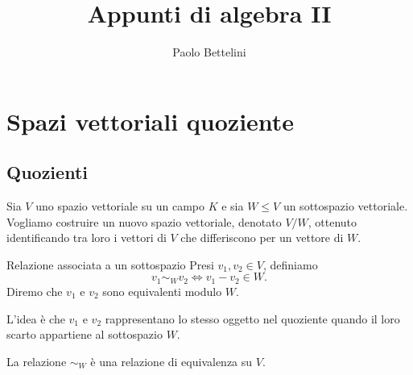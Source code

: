 \documentclass[a4paper]{article}
\title{Appunti di algebra II}
\author{Paolo Bettelini}
\date{}
\begin{document}
\maketitle
\tableofcontents

\section{Spazi vettoriali quoziente}

\subsection{Quozienti}

\begin{radioactive}
Sia \(V\) uno spazio vettoriale su un campo \(K\) e sia \(W \leq V\) un sottospazio vettoriale.
Vogliamo costruire un nuovo spazio vettoriale, denotato \(V/W\), ottenuto identificando tra loro i vettori di \(V\) che differiscono per un vettore di \(W\).
\end{radioactive}

\begin{radioactive}
\begin{snippetdefinition}{Relazione associata a un sottospazio}
    Presi \(v_1,v_2 \in V\), definiamo
    \[
        v_1 \sim_W v_2
        \iff
        v_1-v_2 \in W.
    \]
    Diremo che \(v_1\) e \(v_2\) sono equivalenti modulo \(W\).
\end{snippetdefinition}
\end{radioactive}

\begin{radioactive}
L'idea è che \(v_1\) e \(v_2\) rappresentano lo stesso oggetto nel quoziente quando il loro scarto appartiene al sottospazio \(W\).
\end{radioactive}

\begin{radioactive}
\begin{snippetproposition}{}
    La relazione \(\sim_W\) è una relazione di equivalenza su \(V\).
\end{snippetproposition}
\end{radioactive}
\end{document}
